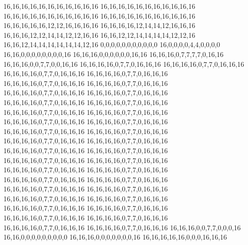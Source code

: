 16,16,16,16,16,16,16,16,16,16,16
16,16,16,16,16,16,16,16,16,16,16
16,16,16,16,16,16,16,16,16,16,16
16,16,16,16,16,16,16,16,16,16,16
16,16,16,16,16,12,12,16,16,16,16
16,16,16,16,12,14,14,12,16,16,16
16,16,16,12,12,14,14,12,12,16,16
16,16,12,12,14,14,14,14,12,12,16
16,16,12,14,14,14,14,14,14,12,16
0,0,0,0,0,0,0,0,0,0,0
16,0,0,0,0,4,4,0,0,0,0
16,16,0,0,0,0,0,0,0,0,16
16,16,16,0,0,0,0,0,0,16,16
16,16,16,0,7,7,7,7,0,16,16
16,16,16,0,0,7,7,0,0,16,16
16,16,16,16,0,7,7,0,16,16,16
16,16,16,16,0,7,7,0,16,16,16
16,16,16,16,0,7,7,0,16,16,16
16,16,16,16,0,7,7,0,16,16,16
16,16,16,16,0,7,7,0,16,16,16
16,16,16,16,0,7,7,0,16,16,16
16,16,16,16,0,7,7,0,16,16,16
16,16,16,16,0,7,7,0,16,16,16
16,16,16,16,0,7,7,0,16,16,16
16,16,16,16,0,7,7,0,16,16,16
16,16,16,16,0,7,7,0,16,16,16
16,16,16,16,0,7,7,0,16,16,16
16,16,16,16,0,7,7,0,16,16,16
16,16,16,16,0,7,7,0,16,16,16
16,16,16,16,0,7,7,0,16,16,16
16,16,16,16,0,7,7,0,16,16,16
16,16,16,16,0,7,7,0,16,16,16
16,16,16,16,0,7,7,0,16,16,16
16,16,16,16,0,7,7,0,16,16,16
16,16,16,16,0,7,7,0,16,16,16
16,16,16,16,0,7,7,0,16,16,16
16,16,16,16,0,7,7,0,16,16,16
16,16,16,16,0,7,7,0,16,16,16
16,16,16,16,0,7,7,0,16,16,16
16,16,16,16,0,7,7,0,16,16,16
16,16,16,16,0,7,7,0,16,16,16
16,16,16,16,0,7,7,0,16,16,16
16,16,16,16,0,7,7,0,16,16,16
16,16,16,16,0,7,7,0,16,16,16
16,16,16,16,0,7,7,0,16,16,16
16,16,16,16,0,7,7,0,16,16,16
16,16,16,16,0,7,7,0,16,16,16
16,16,16,16,0,7,7,0,16,16,16
16,16,16,16,0,7,7,0,16,16,16
16,16,16,16,0,7,7,0,16,16,16
16,16,16,16,0,7,7,0,16,16,16
16,16,16,0,0,7,7,0,0,0,16
16,16,0,0,0,0,0,0,0,0,0
16,16,16,0,0,0,0,0,0,0,16
16,16,16,16,16,0,0,0,16,16,16
